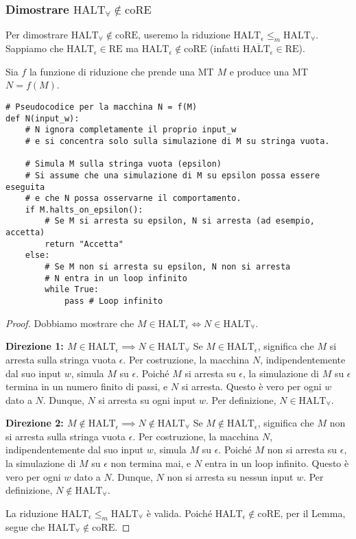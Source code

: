 \documentclass[a4paper, 11pt]{book} %
\theoremstyle{definition}
\begin{document}
\subsubsection{Dimostrare $\text{HALT}_\forall \notin \text{coRE}$}
Per dimostrare $\text{HALT}_\forall \notin \text{coRE}$, useremo la riduzione $\text{HALT}_\epsilon \le_m \text{HALT}_\forall$.
Sappiamo che $\text{HALT}_\epsilon \in \text{RE}$ ma $\text{HALT}_\epsilon \notin \text{coRE}$ (infatti $\overline{\text{HALT}_\epsilon} \in \text{RE}$).

Sia $f$ la funzione di riduzione che prende una MT $M$ e produce una MT $N = f(M)$.
\begin{verbatim}
# Pseudocodice per la macchina N = f(M)
def N(input_w):
    # N ignora completamente il proprio input_w
    # e si concentra solo sulla simulazione di M su stringa vuota.
    
    # Simula M sulla stringa vuota (epsilon)
    # Si assume che una simulazione di M su epsilon possa essere eseguita
    # e che N possa osservarne il comportamento.
    if M.halts_on_epsilon():
        # Se M si arresta su epsilon, N si arresta (ad esempio, accetta)
        return "Accetta"
    else:
        # Se M non si arresta su epsilon, N non si arresta
        # N entra in un loop infinito
        while True:
            pass # Loop infinito
\end{verbatim}

\begin{proof}
Dobbiamo mostrare che $M \in \text{HALT}_\epsilon \iff N \in \text{HALT}_\forall$.

\textbf{Direzione 1: $M \in \text{HALT}_\epsilon \implies N \in \text{HALT}_\forall$}
Se $M \in \text{HALT}_\epsilon$, significa che $M$ si arresta sulla stringa vuota $\epsilon$.
Per costruzione, la macchina $N$, indipendentemente dal suo input $w$, simula $M$ su $\epsilon$. Poiché $M$ si arresta su $\epsilon$, la simulazione di $M$ su $\epsilon$ termina in un numero finito di passi, e $N$ si arresta.
Questo è vero per ogni $w$ dato a $N$. Dunque, $N$ si arresta su ogni input $w$. Per definizione, $N \in \text{HALT}_\forall$.

\textbf{Direzione 2: $M \notin \text{HALT}_\epsilon \implies N \notin \text{HALT}_\forall$}
Se $M \notin \text{HALT}_\epsilon$, significa che $M$ non si arresta sulla stringa vuota $\epsilon$.
Per costruzione, la macchina $N$, indipendentemente dal suo input $w$, simula $M$ su $\epsilon$. Poiché $M$ non si arresta su $\epsilon$, la simulazione di $M$ su $\epsilon$ non termina mai, e $N$ entra in un loop infinito.
Questo è vero per ogni $w$ dato a $N$. Dunque, $N$ non si arresta su nessun input $w$. Per definizione, $N \notin \text{HALT}_\forall$.

La riduzione $\text{HALT}_\epsilon \le_m \text{HALT}_\forall$ è valida.
Poiché $\text{HALT}_\epsilon \notin \text{coRE}$, per il Lemma, segue che $\text{HALT}_\forall \notin \text{coRE}$.
\end{proof}
\end{document}
